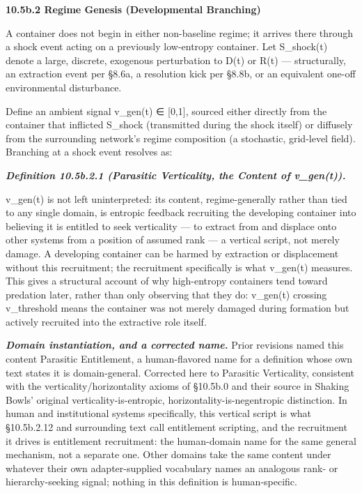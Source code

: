 \documentclass[
]{article}
\begin{document}
\textbf{10.5b.2 Regime Genesis (Developmental Branching)}

A container does not begin in either non-baseline regime; it arrives
there through a shock event acting on a previously low-entropy
container. Let S\_shock(t) denote a large, discrete, exogenous
perturbation to D(t) or R(t) --- structurally, an extraction event per
§8.6a, a resolution kick per §8.8b, or an equivalent one-off
environmental disturbance.

Define an ambient signal v\_gen(t) ∈ {[}0,1{]}, sourced either directly
from the container that inflicted S\_shock (transmitted during the shock
itself) or diffusely from the surrounding network's regime composition
(a stochastic, grid-level field). Branching at a shock event resolves
as:

\emph{\textbf{Definition 10.5b.2.1 (Parasitic Verticality, the Content
of v\_gen(t)).}}

v\_gen(t) is not left uninterpreted: its content, regime-generally
rather than tied to any single domain, is entropic feedback recruiting
the developing container into believing it is entitled to seek
verticality --- to extract from and displace onto other systems from a
position of assumed rank --- a vertical script, not merely damage. A
developing container can be harmed by extraction or displacement without
this recruitment; the recruitment specifically is what v\_gen(t)
measures. This gives a structural account of why high-entropy containers
tend toward predation later, rather than only observing that they do:
v\_gen(t) crossing v\_threshold means the container was not merely
damaged during formation but actively recruited into the extractive role
itself.

\emph{\textbf{Domain instantiation, and a corrected name.}} Prior
revisions named this content Parasitic Entitlement, a human-flavored
name for a definition whose own text states it is domain-general.
Corrected here to Parasitic Verticality, consistent with the
verticality/horizontality axioms of §10.5b.0 and their source in
Shaking Bowls' original verticality-is-entropic, horizontality-is-negentropic
distinction. In human and institutional systems specifically, this
vertical script is what §10.5b.2.12 and surrounding text call
entitlement scripting, and the recruitment it drives is entitlement
recruitment: the human-domain name for the same general mechanism, not a
separate one. Other domains take the same content under whatever their
own adapter-supplied vocabulary names an analogous rank- or
hierarchy-seeking signal; nothing in this definition is human-specific.
\end{document}
